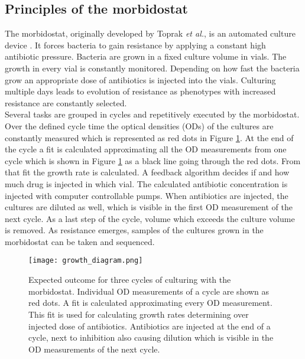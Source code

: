 \subsection{Principles of the morbidostat} 
The morbidostat, originally developed by Toprak \textit{et al.}, is an automated culture device \cite{toprak_building_2013}. It forces bacteria to gain resistance by applying a constant high antibiotic pressure. Bacteria are grown in a fixed culture volume in vials. The growth in every vial is constantly monitored. Depending on how fast the bacteria grow an appropriate dose of antibiotics is injected into the vials. Culturing multiple days leads to evolution of resistance as phenotypes with increased resistance are constantly selected. \\
Several tasks are grouped in cycles and repetitively executed by the morbidostat. Over the defined cycle time the optical densities (ODs) of the cultures are constantly measured which is represented as red dots in Figure \ref{figure:principle}. At the end of the cycle a fit is calculated approximating all the OD measurements from one cycle which is shown in Figure \ref{figure:principle} as a black line going through the red dots. From that fit the growth rate is calculated. A feedback algorithm decides if and how much drug is injected in which vial. The calculated antibiotic concentration is injected with computer controllable pumps. When antibiotics are injected, the cultures are diluted as well, which is visible in the first OD measurement of the next cycle. As a last step of the cycle, volume which exceeds the culture volume is removed. As resistance emerges, samples of the cultures grown in the morbidostat can be taken and sequenced.    
\begin{figure}
	\texttt{[image: growth\_diagram.png]}
	\caption{Expected outcome for three cycles of culturing with the morbidostat. Individual OD measurements of a cycle are shown as red dots. A fit is calculated approximating every OD measurement. This fit is used for calculating growth rates determining over injected dose of antibiotics. Antibiotics are injected at the end of a cycle, next to inhibition also causing dilution which is visible in the OD measurements of the next cycle.}
	\label{figure:principle}
\end{figure} 

